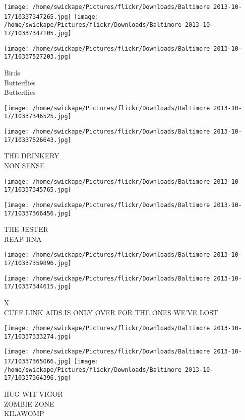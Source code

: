 \documentclass[10pt,letterpaper]{article}
\begin{document}
\texttt{[image: /home/swickape/Pictures/flickr/Downloads/Baltimore 2013-10-17/10337347265.jpg]}
\texttt{[image: /home/swickape/Pictures/flickr/Downloads/Baltimore 2013-10-17/10337347105.jpg]}

\texttt{[image: /home/swickape/Pictures/flickr/Downloads/Baltimore 2013-10-17/10337527203.jpg]}

Birds\\
Butterflies\\
Butterflies
\pagebreak

\texttt{[image: /home/swickape/Pictures/flickr/Downloads/Baltimore 2013-10-17/10337346525.jpg]}

\vspace{0.25in}
\texttt{[image: /home/swickape/Pictures/flickr/Downloads/Baltimore 2013-10-17/10337526643.jpg]}

THE DRINKERY\\
NON SENSE
\pagebreak

\texttt{[image: /home/swickape/Pictures/flickr/Downloads/Baltimore 2013-10-17/10337345765.jpg]}

\vspace{0.25in}
\texttt{[image: /home/swickape/Pictures/flickr/Downloads/Baltimore 2013-10-17/10337366456.jpg]}

THE JESTER\\
REAP RNA
\pagebreak

\texttt{[image: /home/swickape/Pictures/flickr/Downloads/Baltimore 2013-10-17/10337359896.jpg]}

\vspace{0.25in}
\texttt{[image: /home/swickape/Pictures/flickr/Downloads/Baltimore 2013-10-17/10337344615.jpg]}

X\\
CUFF LINK AIDS IS ONLY OVER FOR THE ONES WE'VE LOST
\pagebreak

\texttt{[image: /home/swickape/Pictures/flickr/Downloads/Baltimore 2013-10-17/10337333274.jpg]}

\vspace{0.25in}
\texttt{[image: /home/swickape/Pictures/flickr/Downloads/Baltimore 2013-10-17/10337365066.jpg]}
\texttt{[image: /home/swickape/Pictures/flickr/Downloads/Baltimore 2013-10-17/10337364396.jpg]}

HUG WIT VIGOR\\
ZOMBIE ZONE\\
KILAWOMP
\pagebreak
\end{document}
